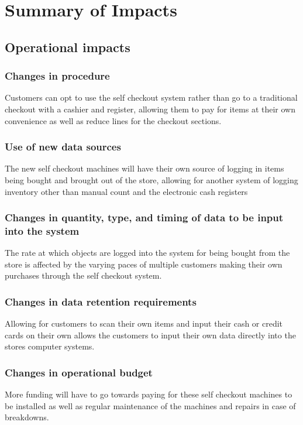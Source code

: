 \section{Summary of Impacts}
\subsection{Operational impacts}

\subsubsection{Changes in procedure}
Customers can opt to use the self checkout system rather than go to a 
traditional checkout with a cashier and register, allowing them to pay for 
items at their own convenience as well as reduce lines for the 
checkout sections.

\subsubsection{Use of new data sources}
The new self checkout machines will have their own source of logging in items 
being bought and brought out of the store, allowing for another system of 
logging inventory other than manual count and the electronic cash registers

\subsubsection{Changes in quantity, type, and timing of data to be input 
into the system}
The rate at which objects are logged into the system for being bought from 
the store is affected by the varying paces of multiple customers making their 
own purchases through the self checkout system.


\subsubsection{Changes in data retention requirements}
Allowing for customers to scan their own items and input their cash or credit 
cards on their own allows the customers to input their own data directly 
into the stores computer systems.

\subsubsection{Changes in operational budget}
More funding will have to go towards paying for these self checkout machines 
to be installed as well as regular maintenance of the machines and 
repairs in case of breakdowns.

